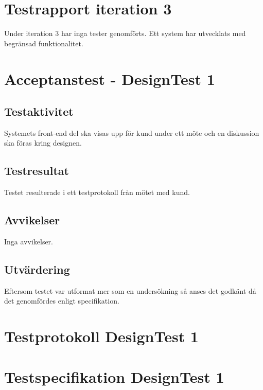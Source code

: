\documentclass[a4paper,10pt, twoside]{article}
\begin{document}


\newpage

\section{Testrapport iteration 3}
Under iteration 3 har inga tester genomförts. Ett system har utvecklats med begränsad funktionalitet.

\section{Acceptanstest - DesignTest 1}
\subsection{Testaktivitet}
    Systemets front-end del ska visas upp för kund under ett möte och en diskussion ska föras kring designen.

\subsection{Testresultat}
    Testet resulterade i ett testprotokoll från mötet med kund.

\subsection{Avvikelser}
    Inga avvikelser.
\subsection{Utvärdering}
    Eftersom testet var utformat mer som en undersökning så anses det godkänt då det genomfördes enligt specifikation.

\clearpage
\appendix
\section{Testprotokoll DesignTest 1}

\section{Testspecifikation DesignTest 1}

\end{document}

